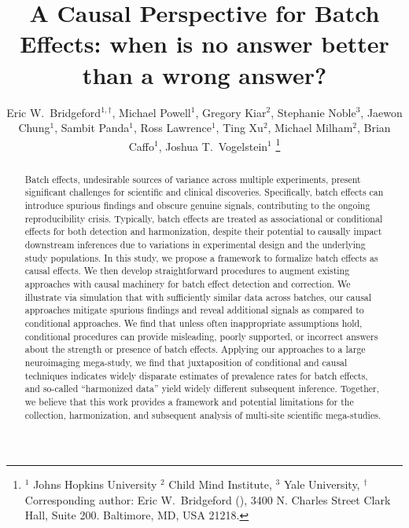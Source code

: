 \documentclass[onefignum, onetabnum,onealgnum,onethmnum, oneeqnum]{siamonline190516}
\title{
A Causal Perspective for Batch Effects: when is no answer better than a wrong answer?
}
\author{
    Eric W.~Bridgeford$^{1,\dagger}$, 
    Michael Powell$^1$,
    Gregory Kiar$^2$,
    Stephanie Noble$^3$,
    Jaewon Chung$^1$,
    Sambit Panda$^1$,
    Ross Lawrence$^1$,
    Ting Xu$^2$,
    Michael Milham$^2$,
    Brian Caffo$^1$,
    Joshua T.~Vogelstein$^{1}$
    \thanks{
     $^1$ Johns Hopkins University $^2$ Child Mind Institute, $^3$ Yale University,
    $^\dagger$ Corresponding author:
      Eric W.~Bridgeford (\email{ebridge2@jhu.edu}), 3400 N. Charles Street Clark Hall, Suite 200. Baltimore, MD, USA 21218.}
}
\newcommand{\edits}[1]{{\color{black} #1 }}
\begin{document}
\maketitle

\begin{abstract}
\edits{Batch effects, undesirable sources of variance across multiple experiments, present significant challenges for scientific and clinical discoveries. Specifically, batch effects can introduce spurious findings and obscure genuine signals, contributing to the ongoing reproducibility crisis. Typically, batch effects are treated as associational or conditional effects for both detection and harmonization, despite their potential to causally impact downstream inferences due to variations in experimental design and the underlying study populations. In this study, we propose a framework to formalize batch effects as causal effects. We then develop straightforward procedures to augment existing approaches with causal machinery for batch effect detection and correction. We illustrate via simulation that with sufficiently similar data across batches, our causal approaches mitigate spurious findings and reveal additional signals as compared to conditional approaches. We find that unless often inappropriate assumptions hold, conditional procedures can provide misleading, poorly supported, or incorrect answers about the strength or presence of batch effects. Applying our approaches to a large neuroimaging mega-study, we find that juxtaposition of conditional and causal techniques indicates widely disparate estimates of prevalence rates for batch effects, and so-called ``harmonized data'' yield widely different subsequent inference. Together, we believe that this work provides a framework and potential limitations for the collection, harmonization, and subsequent analysis of multi-site scientific mega-studies.}
\end{abstract}










% 





\appendix

% 

\end{document}
